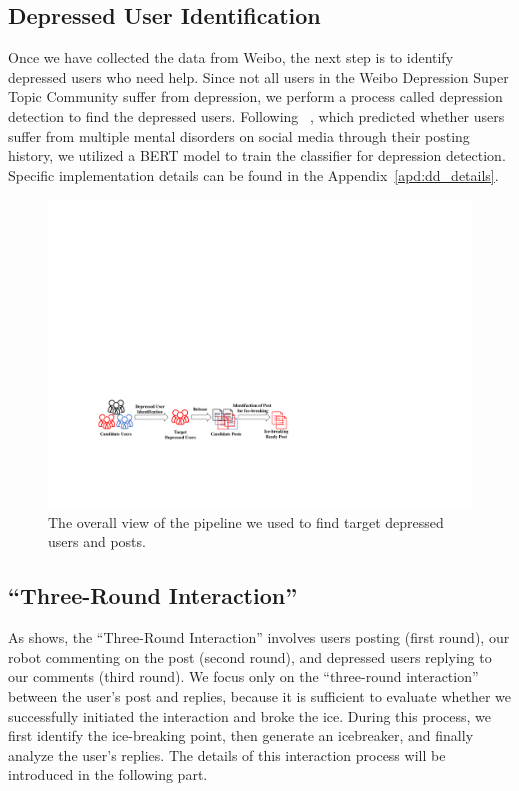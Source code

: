 \subsection{Depressed User Identification} 
\label{sec:depression_detection}
Once we have collected the data from Weibo, the next step is to identify depressed users who need help. Since not all users in the Weibo Depression Super Topic Community suffer from depression, we perform a process called depression detection to find the depressed users.
Following ~\citet{zhang2022symptom}, which predicted whether users suffer from multiple mental disorders on social media through their posting history, we utilized a BERT model \cite{devlin2018bert} to train the classifier for depression detection. Specific implementation details can be found in the Appendix~\ref{apd:dd_details}.
\begin{figure}[th]
	\centering
	\includegraphics[width=1.7\columnwidth]{images/pipeline1.pdf}
	\caption{The overall view of the pipeline we used to find target depressed users and posts.}
\label{fig:pipeline1}
\end{figure}

\subsection{``Three-Round Interaction''}
\label{sec:3round}
As  shows, the ``Three-Round Interaction'' involves users posting (first round), our robot commenting on the post (second round), and depressed users replying to our comments (third round).
We focus only on the ``three-round interaction'' between the user’s post and replies, because it is sufficient to evaluate whether we successfully initiated the interaction and broke the ice. 
During this process, we first identify the ice-breaking point, then generate an icebreaker, and finally analyze the user's replies. The details of this interaction process will be introduced in the following part.

